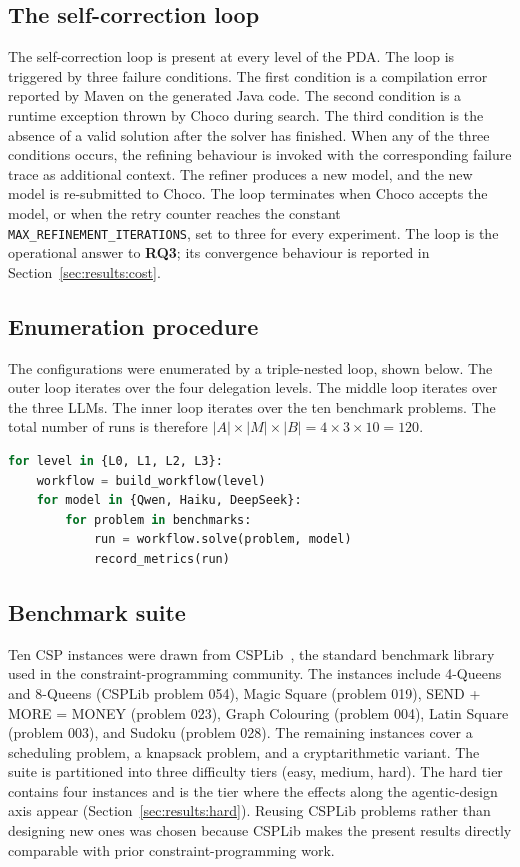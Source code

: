 \documentclass[11pt,a4paper]{article}
\newcommand{\rqthree}{\textbf{RQ3}}
\begin{document}
\subsection{The self-correction loop}\label{sec:method:refine}
The self-correction loop is present at every level of the PDA. The loop is triggered by three failure conditions. The first condition is a compilation error reported by Maven on the generated Java code. The second condition is a runtime exception thrown by Choco during search. The third condition is the absence of a valid solution after the solver has finished. When any of the three conditions occurs, the refining behaviour is invoked with the corresponding failure trace as additional context. The refiner produces a new model, and the new model is re-submitted to Choco. The loop terminates when Choco accepts the model, or when the retry counter reaches the constant \texttt{MAX\_REFINEMENT\_ITERATIONS}, set to three for every experiment. The loop is the operational answer to \rqthree{}; its convergence behaviour is reported in Section~\ref{sec:results:cost}.

\subsection{Enumeration procedure}\label{sec:method:enum}
The configurations were enumerated by a triple-nested loop, shown below. The outer loop iterates over the four delegation levels. The middle loop iterates over the three LLMs. The inner loop iterates over the ten benchmark problems. The total number of runs is therefore $|A| \times |M| \times |B| = 4 \times 3 \times 10 = 120$.

\begin{lstlisting}[language=Python]
for level in {L0, L1, L2, L3}:
    workflow = build_workflow(level)
    for model in {Qwen, Haiku, DeepSeek}:
        for problem in benchmarks:
            run = workflow.solve(problem, model)
            record_metrics(run)
\end{lstlisting}

\subsection{Benchmark suite}\label{sec:method:bench}
Ten CSP instances were drawn from CSPLib~\cite{R2}, the standard benchmark library used in the constraint-programming community. The instances include 4-Queens and 8-Queens (CSPLib problem 054), Magic Square (problem 019), SEND + MORE = MONEY (problem 023), Graph Colouring (problem 004), Latin Square (problem 003), and Sudoku (problem 028). The remaining instances cover a scheduling problem, a knapsack problem, and a cryptarithmetic variant. The suite is partitioned into three difficulty tiers (easy, medium, hard). The hard tier contains four instances and is the tier where the effects along the agentic-design axis appear (Section~\ref{sec:results:hard}). Reusing CSPLib problems rather than designing new ones was chosen because CSPLib makes the present results directly comparable with prior constraint-programming work.
\end{document}
